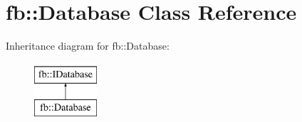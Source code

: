 \hypertarget{classfb_1_1_database}{\section{fb\+:\+:Database Class Reference}
\label{classfb_1_1_database}
}
Inheritance diagram for fb\+:\+:Database\+:\begin{figure}[H]
\begin{center}
\leavevmode
\includegraphics[height=2.000000cm]{classfb_1_1_database}
\end{center}
\end{figure}

